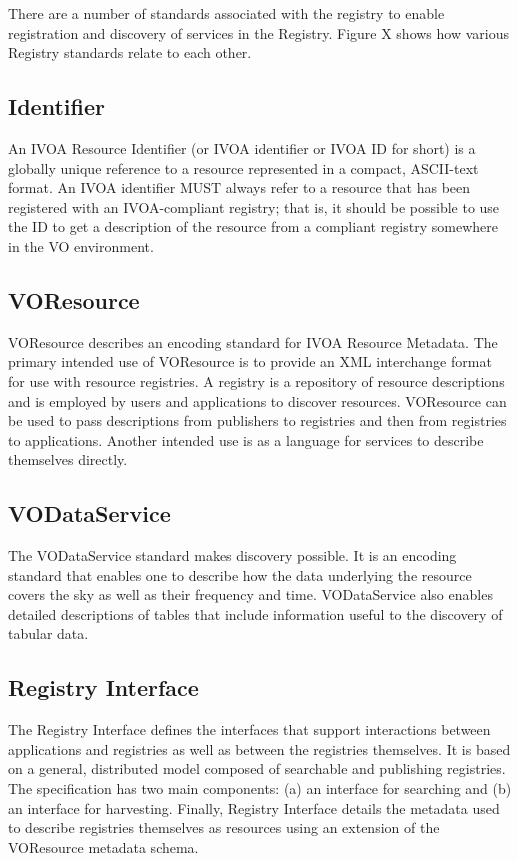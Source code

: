 \documentclass[11pt,a4paper]{ivoa}
\begin{document}
There are a number of standards associated with the registry to enable registration and discovery 
of services in the Registry.  Figure X shows how various Registry standards relate to each other.

\subsection{Identifier}

An IVOA Resource Identifier (or IVOA identifier or IVOA ID for short) is a globally unique reference to a resource represented in a compact, ASCII-text format.  An IVOA identifier MUST always refer to a resource that has been registered with an IVOA-compliant registry; that is, it should be possible to use the ID to get a description of the resource from a compliant registry somewhere in the VO environment.

\subsection{VOResource}

VOResource describes an encoding standard for IVOA Resource Metadata. The primary intended use of VOResource is to provide an XML interchange format for use with resource registries. A registry is a repository of resource descriptions and is employed by users and applications to discover resources. VOResource can be used to pass descriptions from publishers to registries and then from registries to applications. Another intended use is as a language for services to describe themselves directly.

\subsection{VODataService}

The VODataService standard makes discovery possible.  It is an encoding standard that enables one to describe how the data underlying the resource covers the sky as well as their frequency and time. VODataService also enables detailed descriptions of tables that include information useful to the discovery of tabular data. 

\subsection{Registry Interface}

The Registry Interface defines the interfaces that support interactions between applications and registries as well as between the registries themselves.  It is based on a general, distributed model composed of searchable and publishing registries. The specification has two main components: (a) an interface for searching and (b) an interface for harvesting.  Finally, Registry Interface details the metadata used to describe registries themselves as resources using an extension of the VOResource metadata schema.
\end{document}
